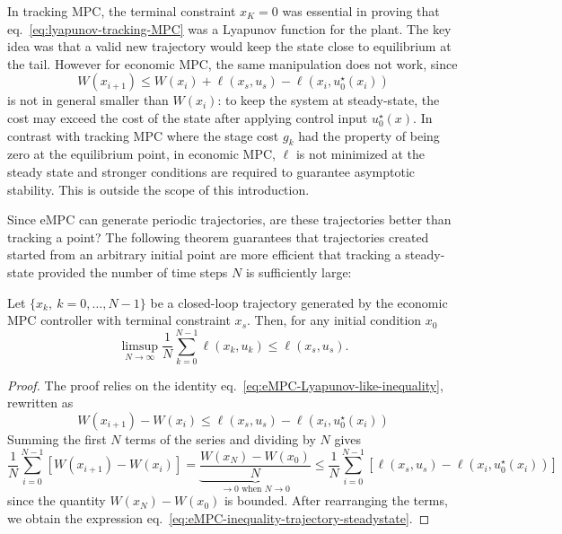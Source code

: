 In tracking MPC, the terminal constraint $x_K=0$ was essential in proving that eq.~\eqref{eq:lyapunov-tracking-MPC} was a Lyapunov function for the plant. The key idea was that a valid new trajectory would keep the state close to equilibrium at the tail. However for economic MPC, the same manipulation does not work, since
\begin{equation}
  \label{eq:eMPC-Lyapunov-like-inequality}
  W(x_{i+1}) \le W(x_i) + \ell(x_s,u_s) - \ell(x_i,u_0^\star(x_i))
\end{equation}
is not in general smaller than $W(x_i)$: to keep the system at steady-state, the cost may exceed the cost of the state after applying control input $u_0^\star(x)$. In contrast with tracking MPC where the stage cost $g_k$ had the property of being zero at the equilibrium point, in economic MPC, $\ell$ is not minimized at the steady state and stronger conditions are required to guarantee asymptotic stability. This is outside the scope of this introduction.

Since eMPC can generate periodic trajectories, are these trajectories better than tracking a point? The following theorem guarantees that trajectories created started from an arbitrary initial point are more efficient that tracking a steady-state provided the number of time steps $N$ is sufficiently large:
\begin{theorem}
  Let $\{x_k,\ k=0,\ldots,N-1\}$ be a closed-loop trajectory generated by the economic MPC controller with terminal constraint $x_s$. Then, for any initial condition $x_0$
  \begin{equation}
    \label{eq:eMPC-inequality-trajectory-steadystate}
    \limsup_{N\rightarrow \infty} \frac{1}{N} \sum_{k=0}^{N-1} \ell(x_k,u_k) \le \ell(x_s,u_s).
  \end{equation}
\end{theorem}
\begin{proof}
  The proof relies on the identity eq.~\eqref{eq:eMPC-Lyapunov-like-inequality}, rewritten as
  \begin{equation*}
    W(x_{i+1}) - W(x_i) \le \ell(x_s,u_s) - \ell(x_i,u_0^\star(x_i))
  \end{equation*}
  Summing the first $N$ terms of the series and dividing by $N$ gives
  \begin{equation*}
    \frac{1}{N}\sum_{i=0}^{N-1} \left[W(x_{i+1}) - W(x_i)\right] = \underbrace{\frac{W(x_N) - W(x_0)}{N}}_{\rightarrow 0 \text{ when } N\rightarrow 0} \le \frac{1}{N}\sum_{i=0}^{N-1}  \left[\ell(x_s,u_s) - \ell(x_i,u_0^\star(x_i))\right]
  \end{equation*}
  since the quantity $W(x_N) - W(x_0)$ is bounded. After rearranging the terms, we obtain the expression eq.~\eqref{eq:eMPC-inequality-trajectory-steadystate}.
\end{proof}


